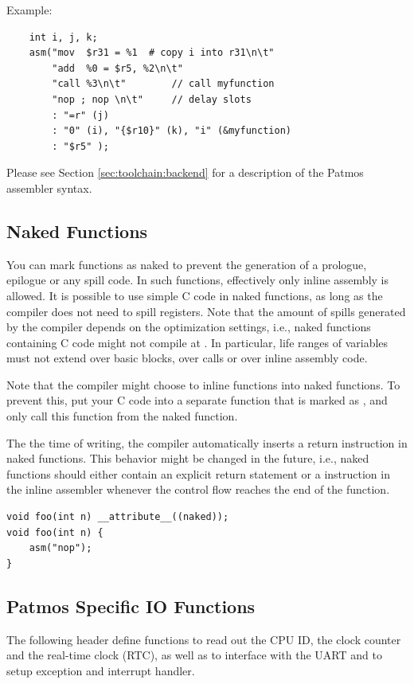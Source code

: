 Example:
\begin{verbatim}
    int i, j, k;
    asm("mov  $r31 = %1  # copy i into r31\n\t"
        "add  %0 = $r5, %2\n\t"
        "call %3\n\t"        // call myfunction
        "nop ; nop \n\t"     // delay slots
        : "=r" (j)
        : "0" (i), "{$r10}" (k), "i" (&myfunction)
        : "$r5" );
\end{verbatim}

Please see Section \ref{sec:toolchain:backend} for a description of the Patmos assembler syntax.

\subsection{Naked Functions}

You can mark functions as naked to prevent the generation of a prologue, epilogue or any spill code.
In such functions, effectively only inline assembly is allowed. It is possible to use simple C code in naked 
functions, as long as the compiler does not need to spill registers. Note that the amount of spills generated by
the compiler depends on the optimization settings, i.e., naked functions containing C code might not compile at
. In particular, life ranges of variables must not extend over basic blocks, over calls or over
inline assembly code.

Note that the compiler might choose to inline functions into naked functions. To prevent this, put your C code into a
separate function that is marked as , and only call this function from the naked function.

The the time of writing, the compiler automatically inserts a return instruction in naked functions. This behavior might be changed
in the future, i.e., naked functions should either contain an explicit return statement or a  instruction in
the inline assembler whenever the control flow reaches the end of the function.

\begin{verbatim}
void foo(int n) __attribute__((naked));
void foo(int n) {
    asm("nop");
}
\end{verbatim}


\subsection{Patmos Specific IO Functions}

The following header define functions to read out the CPU ID, the clock counter and the real-time clock (RTC), as well as to
interface with the UART and to setup exception and interrupt handler.

